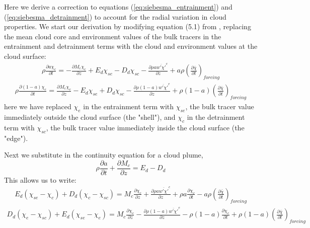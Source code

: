 \documentclass[draft,grl]{agutex}
\begin{document}
\begin{article}
Here we derive a correction to equations (\ref{eq:siebesma_entrainment}) and 
(\ref{eq:siebesma_detrainment}) to account for the radial variation in cloud 
properties.  We start our derivation by modifying equation (5.1) from 
\cite{Siebesma1995}, replacing the mean cloud core and environment values of 
the bulk tracers in the entrainment and detrainment terms with the cloud and 
environment values at the cloud surface:
\begin{eqnarray}
  \label{eq:entrainment_derivation_1}
    \rho \frac{\partial a \chi_c}{\partial t} 
    = - \frac{\partial M_c \chi_c}{\partial z} 
    + E_d \chi_{se} - D_d \chi_{sc} 
    - \frac{\partial \rho a \overline{w' \chi'}^c}{\partial z} 
    + a \rho \left(\frac{\partial \bar{\chi}}{\partial t}\right)_{forcing}
\end{eqnarray}
\begin{eqnarray}
  \label{eq:detrainment_derivation_1}
    \rho \frac{\partial (1 - a) \chi_e}{\partial t}
    = \frac{\partial M_c \chi_e}{\partial z} 
    - E_d \chi_{se} + D_d \chi_{sc} 
    - \frac{\partial \rho (1 - a) \overline{w' \chi'}^e}{\partial z} 
    + \rho (1 - a) \left(\frac{\partial \bar{\chi}}{\partial t}\right)_{forcing}
\end{eqnarray}
here we have replaced $\chi_e$ in the entrainment term with $\chi_{se}$, the 
bulk tracer value immediately outside the cloud surface (the "shell"), and 
$\chi_c$ in the detrainment term with $\chi_{sc}$, the bulk tracer value 
immediately inside the cloud surface (the "edge").

Next we substitute in the continuity equation for a cloud plume,
\begin{equation}
   \label{eq:continuity}
   \rho \frac{\partial a}{\partial t} + \frac{\partial M_c}{\partial z} = E_d - D_d
\end{equation}
This allows us to write:
\begin{eqnarray}
  \label{eq:entrainment_derivation_2}
    E_d (\chi_{se} - \chi_c) + D_d (\chi_c - \chi_{sc}) 
    = M_c \frac{\partial \chi_c}{\partial z}
    + \frac{\partial \rho a \overline{w' \chi'}^c}{\partial z} 
    + \rho a \frac{\partial \chi_c}{\partial t}
    - a \rho \left(\frac{\partial \bar{\chi}}{\partial t}\right)_{forcing}
\end{eqnarray}
\begin{eqnarray}
  \label{eq:detrainment_derivation_2}
    D_d (\chi_e - \chi_{sc}) + E_d (\chi_{se} - \chi_e)
    = M_c \frac{\partial \chi_e}{\partial z}
    - \frac{\partial \rho (1 - a) \overline{w' \chi'}^e}{\partial z} 
    - \rho (1 - a) \frac{\partial \chi_e}{\partial t}
    + \rho (1 - a) \left(\frac{\partial \bar{\chi}}{\partial t}\right)_{forcing}
\end{eqnarray}


\end{article}
\end{document}
